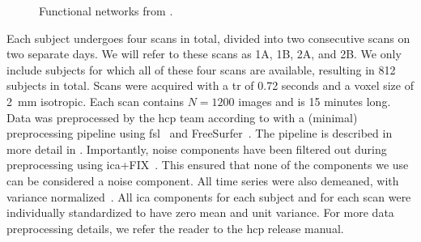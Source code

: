 \begin{figure}[t]
  \hspace{0.08\textwidth}
  \hspace{0.08\textwidth}
  \caption{
    Functional networks from \textcite{Smith2009}.
  }\label{fig:brainmap-functional-networks}
\end{figure}

\captionsetup[subfigure]{labelformat=parens}


Each subject undergoes four scans in total, divided into two consecutive scans on two separate days.
We will refer to these scans as 1A, 1B, 2A, and 2B.
We only include subjects for which all of these four scans are available, resulting in 812 subjects in total.
Scans were acquired with a \gls{tr} of 0.72 seconds and a voxel size of 2~mm isotropic.
Each scan contains $N = 1200$ images and is 15 minutes long.
%
Data was preprocessed by the \gls{hcp} team according to \textcite{Smith2013a} with a (minimal) preprocessing pipeline using \gls{fsl}~\parencite{Jenkinson2012} and FreeSurfer~\parencite{Fischl2012}.
The pipeline is described in more detail in \textcite{Jenkinson2002, Glasser2013, Smith2013b}.
Importantly, noise components have been filtered out during preprocessing using \gls{ica}+FIX~\parencite{Salimi2014, Griffanti2014}.
This ensured that none of the components we use can be considered a noise component.
All time series were also demeaned, with variance normalized~\parencite{Beckmann2004}.
All \gls{ica} components for each subject and for each scan were individually standardized to have zero mean and unit variance.
For more data preprocessing details, we refer the reader to the \gls{hcp} release manual.


